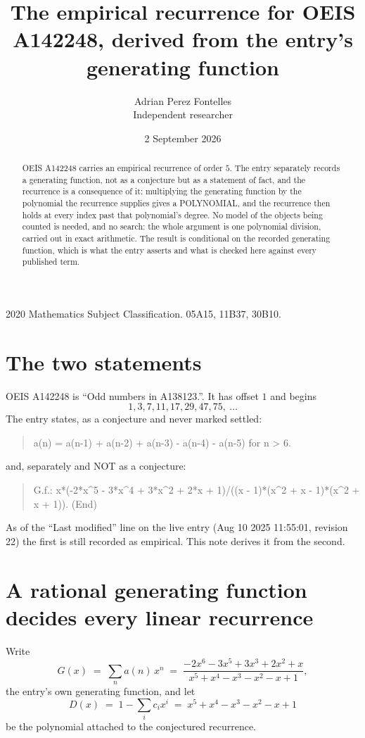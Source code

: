 \documentclass[11pt,a4paper]{article}
\title{The empirical recurrence for OEIS A142248, derived from the entry's generating function}
\author{Adrian Perez Fontelles\\ \small Independent researcher}
\date{2 September 2026}
\theoremstyle{plain}
\theoremstyle{definition}
\begin{document}
\maketitle

\begin{abstract}
OEIS A142248 carries an empirical recurrence of order $5$. The entry separately records a
generating function, not as a conjecture but as a statement of fact, and the recurrence is a
consequence of it: multiplying the generating function by the polynomial the recurrence
supplies gives a POLYNOMIAL, and the recurrence then holds at every index past that
polynomial's degree. No model of the objects being counted is needed, and no search: the
whole argument is one polynomial division, carried out in exact arithmetic. The result is
conditional on the recorded generating function, which is what the entry asserts and what is
checked here against every published term.
\end{abstract}

\noindent\small 2020 Mathematics Subject Classification. 05A15, 11B37, 30B10.\normalsize

\section{The two statements}

OEIS A142248 is ``Odd numbers in A138123.''. It has offset $1$ and begins
\[
1, 3, 7, 11, 17, 29, 47, 75,\ \dots
\]
The entry states, as a conjecture and never marked settled:
\begin{quote}
a(n) = a(n-1) + a(n-2) + a(n-3) - a(n-4) - a(n-5) for n > 6.
\end{quote}
and, separately and NOT as a conjecture:
\begin{quote}
G.f.: x*(-2*x\^{}5 - 3*x\^{}4 + 3*x\^{}2 + 2*x + 1)/((x - 1)*(x\^{}2 + x - 1)*(x\^{}2 + x + 1)). (End)
\end{quote}
As of the ``Last modified'' line on the live entry (Aug 10 2025 11:55:01, revision 22) the first is still
recorded as empirical. This note derives it from the second.

\section{A rational generating function decides every linear recurrence}

Write
\[
G(x)\;=\;\sum_{n}a(n)\,x^{n}\;=\;\frac{- 2 x^{6} - 3 x^{5} + 3 x^{3} + 2 x^{2} + x}{x^{5} + x^{4} - x^{3} - x^{2} - x + 1},
\]
the entry's own generating function, and let
\[
D(x)\;=\;1-\sum_i c_i x^{i}\;=\;x^{5} + x^{4} - x^{3} - x^{2} - x + 1
\]
be the polynomial attached to the conjectured recurrence.
\end{document}
